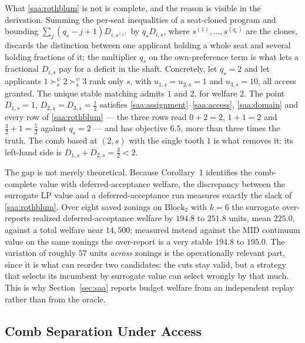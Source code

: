 \documentclass{article}
\begin{document}
What \eqref{saa:rothblum} is not is complete, and the reason is visible in the derivation. Summing the per-seat inequalities of a seat-cloned program and bounding $\sum_{j} (q_s - j + 1) D_{i, s^{(j)}}$ by $q_s D_{i,s}$, where $s^{(1)}, \dots, s^{(q_s)}$ are the clones, discards the distinction between one applicant holding a whole seat and several holding fractions of it; the multiplier $q_s$ on the own-preference term is what lets a fractional $D_{i,s}$ pay for a deficit in the shaft. Concretely, let $q_s = 2$ and let applicants $1 \succ_s^\psi 2 \succ_s^\psi 3$ rank only $s$, with $u_{1,s} = u_{2,s} = 1$ and $u_{3,s} = 10$, all access granted. The unique stable matching admits $1$ and $2$, for welfare $2$. The point $D_{1,s} = 1$, $D_{2,s} = D_{3,s} = \tfrac12$ satisfies \eqref{saa:assignment}--\eqref{saa:access}, \eqref{saa:domain} and every row of \eqref{saa:rothblum} --- the three rows read $0 + 2 = 2$, $1 + 1 = 2$ and $\tfrac32 + 1 = \tfrac52$ against $q_s = 2$ --- and has objective $6.5$, more than three times the truth. The comb based at $(2,s)$ with the single tooth $1$ is what removes it: its left-hand side is $D_{1,s} + D_{2,s} = \tfrac32 < 2$.

The gap is not merely theoretical. Because Corollary~1 identifies the comb-complete value with deferred-acceptance welfare, the discrepancy between the surrogate LP value and a deferred-acceptance run measures exactly the slack of \eqref{saa:rothblum}. Over eight saved zonings on $\text{Block}_2$ with $k = 6$ the surrogate over-reports realized deferred-acceptance welfare by $194.8$ to $251.8$ units, mean $225.0$, against a total welfare near $14{,}500$; measured instead against the MID continuum value on the same zonings the over-report is a very stable $194.8$ to $195.0$. The variation of roughly $57$ units \emph{across} zonings is the operationally relevant part, since it is what can reorder two candidates: the cuts stay valid, but a strategy that selects its incumbent by surrogate value can select wrongly by that much. This is why Section~\ref{sec:saa} reports budget welfare from an independent replay rather than from the oracle.

\subsection{Comb Separation Under Access}
\label{app:ap_sep}
\end{document}
